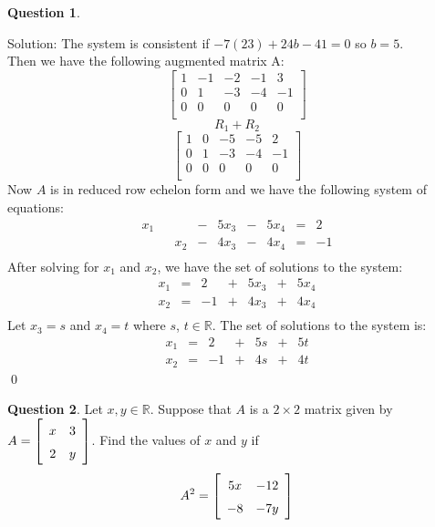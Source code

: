 \documentclass{article}
\newcommand{\R}{\mathbb{R}}
\theoremstyle{definition}
\newtheorem{question}{Question}
\begin{document}
\begin{question}
\begin{enumerate}
Solution: The system is consistent if \(-7(23)+24b-41=0\) so \(b=5\). \\ Then we have the following augmented matrix A:
\[\left[
\begin{array}{cccc|c}
    1 & -1 & -2 & -1 & 3 \\
    0 & 1 & -3 & -4 & -1 \\
    0 & 0 & 0 & 0 & 0 \\
\end{array}
\right]\]
\[R_1+R_2\]
\[\left[
\begin{array}{cccc|c}
    1 & 0 & -5 & -5 & 2 \\
    0 & 1 & -3 & -4 & -1 \\
    0 & 0 & 0 & 0 & 0 \\
\end{array}
\right]\]
Now \(A\) is in reduced row echelon form and we have the following system of equations:
\[\begin{array}{ccccccccc}
    x_1 &  &  & - & 5x_3 & - & 5x_4 & = & 2 \\
    &  & x_2 & - & 4x_3 & - & 4x_4 & = & -1 \\
\end{array}\]
After solving for \(x_1\) and \(x_2\), we have the set of solutions to the system:
\[\begin{array}{ccccccc}
    x_1 & = & 2 & + & 5x_3 & + & 5x_4 \\
    x_2 & = & -1 & + & 4x_3 & + & 4x_4\\
\end{array}\]
Let \(x_3 = s\) and \(x_4=t\) where \(s\), \(t \in \R\). The set of solutions to the system is:
\[\begin{array}{ccccccc}
    x_1 & = & 2 & + & 5s & + & 5t \\
    x_2 & = & -1 & + & 4s & + & 4t
\end{array}\] \qed
\end{enumerate}

\end{question}





\vspace{.75cm}

\label{Question 4}


\begin{question} Let \(x,y\in\R\). Suppose that $A$ is a $2\times 2$ matrix given by $A = \renewcommand{\arraystretch}{1.5} \left[\begin{array}{cc} x & 3 \\ 2 & y \end{array}\right]$. Find the values of \(x\) and \(y\) if \[A^2 = \renewcommand{\arraystretch}{1.5} \left[\begin{array}{cc} 5x & -12 \\ -8 & -7y \end{array}\right]\]

\end{question}
\end{document}
